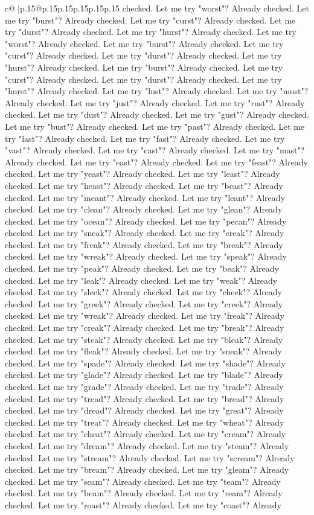 \documentclass{article}
\begin{document}
{\begin{supertabular}{c@{$\;$}|p{.15\linewidth}@{}p{.15\linewidth}p{.15\linewidth}p{.15\linewidth}p{.15\linewidth}p{.15\linewidth}}
{{{checked. Let me try "worst"? Already checked. Let me try "burst"? Already checked. Let me try "curst"? Already checked. Let me try "durst"? Already checked. Let me try "hurst"? Already checked. Let me try "worst"? Already checked. Let me try "burst"? Already checked. Let me try "curst"? Already checked. Let me try "durst"? Already checked. Let me try "hurst"? Already checked. Let me try "burst"? Already checked. Let me try "curst"? Already checked. Let me try "durst"? Already checked. Let me try "hurst"? Already checked. Let me try "lust"? Already checked. Let me try "must"? Already checked. Let me try "just"? Already checked. Let me try "rust"? Already checked. Let me try "dust"? Already checked. Let me try "gust"? Already checked. Let me try "bust"? Already checked. Let me try "past"? Already checked. Let me try "last"? Already checked. Let me try "fast"? Already checked. Let me try "vast"? Already checked. Let me try "cast"? Already checked. Let me try "mast"? Already checked. Let me try "east"? Already checked. Let me try "feast"? Already checked. Let me try "yeast"? Already checked. Let me try "least"? Already checked. Let me try "heast"? Already checked. Let me try "beast"? Already checked. Let me try "meant"? Already checked. Let me try "leant"? Already checked. Let me try "clean"? Already checked. Let me try "glean"? Already checked. Let me try "ocean"? Already checked. Let me try "pecan"? Already checked. Let me try "sneak"? Already checked. Let me try "creak"? Already checked. Let me try "freak"? Already checked. Let me try "break"? Already checked. Let me try "wreak"? Already checked. Let me try "speak"? Already checked. Let me try "peak"? Already checked. Let me try "beak"? Already checked. Let me try "leak"? Already checked. Let me try "weak"? Already checked. Let me try "sleek"? Already checked. Let me try "cheek"? Already checked. Let me try "greek"? Already checked. Let me try "creek"? Already checked. Let me try "wreak"? Already checked. Let me try "freak"? Already checked. Let me try "creak"? Already checked. Let me try "break"? Already checked. Let me try "steak"? Already checked. Let me try "bleak"? Already checked. Let me try "fleak"? Already checked. Let me try "sneak"? Already checked. Let me try "spade"? Already checked. Let me try "shade"? Already checked. Let me try "glade"? Already checked. Let me try "blade"? Already checked. Let me try "grade"? Already checked. Let me try "trade"? Already checked. Let me try "tread"? Already checked. Let me try "bread"? Already checked. Let me try "dread"? Already checked. Let me try "great"? Already checked. Let me try "treat"? Already checked. Let me try "wheat"? Already checked. Let me try "cheat"? Already checked. Let me try "cream"? Already checked. Let me try "dream"? Already checked. Let me try "steam"? Already checked. Let me try "stream"? Already checked. Let me try "scream"? Already checked. Let me try "bream"? Already checked. Let me try "gleam"? Already checked. Let me try "seam"? Already checked. Let me try "team"? Already checked. Let me try "beam"? Already checked. Let me try "ream"? Already checked. Let me try "roast"? Already checked. Let me try "coast"? Already }}}
\end{supertabular}}
\end{document}

